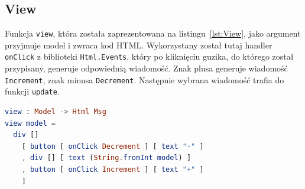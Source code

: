 \documentclass[twoside,a4paper]{report}
\begin{document}
\subsection{View}
Funkcja \texttt{view}, która została zaprezentowana na listingu~\ref{lst:View}, jako argument przyjmuje model i zwraca kod HTML\@.
Wykorzystany został tutaj handler \texttt{onClick} z biblioteki \texttt{Html.Events}, który po kliknięciu guzika, do którego został przypisany, generuje odpowiednią wiadomość.
Znak plusa generuje wiadomość \texttt{Increment}, znak minusa \texttt{Decrement}.
Następnie wybrana wiadomość trafia do funkcji \texttt{update}.

\begin{lstlisting}[caption={\textit{The Elm Architecture} --- View},label={lst:View},language={Elm}]
view : Model -> Html Msg
view model =
  div []
    [ button [ onClick Decrement ] [ text "-" ]
    , div [] [ text (String.fromInt model) ]
    , button [ onClick Increment ] [ text "+" ]
    ]
\end{lstlisting}
\end{document}

